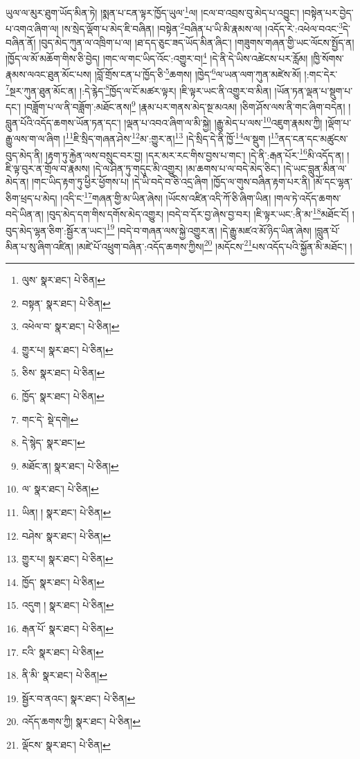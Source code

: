 ཡུལ་ལ་མུར་ཐུག་ཡོད་མིན་ཏེ། །སྨན་པ་ངན་ལྟར་ཁྱོད་ཡུལ་\footnote{ལུས་  སྣར་ཐང་།  པེ་ཅིན། }ལ། །ངལ་བ་འབྲས་བུ་མེད་པ་འབྱུང་། །བསྟེན་པར་བྱེད་པ་འགའ་ཞིག་ལ། །ས་སྲེད་ལྡོག་པ་མེད་ཇི་བཞིན། །བསྟེན་\footnote{བསྟན་  སྣར་ཐང་།  པེ་ཅིན། }བཞིན་པ་ཡི་མི་རྣམས་ལ། །འདོད་རེ་:འཕེལ་བའང་\footnote{འཕེལ་བ་  སྣར་ཐང་།  པེ་ཅིན། }དེ་བཞིན་ནོ། །བུད་མེད་ཀུན་ལ་འཁྲིག་པ་ལ། །ཐ་དད་ཅུང་ཟད་ཡོད་མིན་ཞིང་། །གཟུགས་གཞན་གྱི་ཡང་ལོངས་སྤྱོད་ན། །ཁྱོད་ལ་མོ་མཆོག་གིས་ཅི་བྱེད། །གང་ལ་གང་ཡིད་འོང་:འགྱུར་བ།\footnote{གྱུར་པ།  སྣར་ཐང་།  པེ་ཅིན། } །དེ་ནི་དེ་ཡིས་འཚེངས་པར་རློམ། །ཁྱི་སོགས་རྣམས་ལའང་ཐུན་མོང་པས། །བློ་གྲོས་ངན་པ་ཁྱོད་ཅི་\footnote{ཅིས་  སྣར་ཐང་།  པེ་ཅིན། }ཆགས། །ཁྱེད་\footnote{ཁྱོད་  སྣར་ཐང་།  པེ་ཅིན། }ལ་ཡན་ལག་ཀུན་མཛེས་མོ། །:གང་དེར་\footnote{གང་དེ་  སྡེ་དགེ། }སྔར་ཀུན་ཐུན་མོང་ན། །:དེ་རྙེད་\footnote{དེ་སྙེད་  སྣར་ཐང་། }ཁྱོད་ལ་ངོ་མཚར་ལྟར། །ཇི་ལྟར་ཡང་ནི་འགྱུར་བ་མིན། །ཡོན་ཏན་ལྡན་པ་སྡུག་པ་དང་། །བཟློག་པ་ལ་ནི་བཟློག་:མཐོང་ནས།\footnote{མཐོང་ན།  སྣར་ཐང་།  པེ་ཅིན། } །རྣམ་པར་གནས་མེད་སྔ་མའམ། །ཅིག་ཤོས་ལས་ནི་གང་ཞིག་བདེན། །བླུན་པོའི་འདོད་ཆགས་ཡོན་ཏན་དང་། །ལྡན་པ་འབའ་ཞིག་ལ་མི་སྐྱེ། །རྒྱུ་མེད་པ་ལས་\footnote{ལ་  སྣར་ཐང་།  པེ་ཅིན། }འཇུག་རྣམས་ཀྱི། །ལྡོག་པ་རྒྱུ་ལས་ག་ལ་ཞིག །\footnote{ཡིན། །  སྣར་ཐང་།  པེ་ཅིན། }ཇི་སྲིད་གཞན་ཤེས་\footnote{བཤེས་  སྣར་ཐང་།  པེ་ཅིན། }མ་:གྱུར་ན།\footnote{གྱུར་པ།  སྣར་ཐང་།  པེ་ཅིན། } །དེ་སྲིད་དེ་ནི་ཁྱོ་\footnote{ཁྱོད་  སྣར་ཐང་།  པེ་ཅིན། }ལ་སྡུག །\footnote{འདུག །  སྣར་ཐང་།  པེ་ཅིན། }ནད་ངན་དང་མཚུངས་བུད་མེད་ནི། །རྟག་ཏུ་རྐྱེན་ལས་བསྲུང་བར་བྱ། །དར་མར་རང་གིས་བྱས་པ་གང་། །དེ་ནི་:རྒན་པོར་\footnote{རྒན་པོ་  སྣར་ཐང་།  པེ་ཅིན། }མི་འདོད་ན། །ཇི་ལྟ་བུར་ན་གྲོལ་བ་རྣམས། །དེ་ལ་ཤིན་ཏུ་གདུང་མི་འགྱུར། །མ་ཆགས་པ་ལ་བདེ་མེད་ཅིང་། །དེ་ཡང་བླུན་མིན་ལ་མེད་ན། །གང་ཡིད་རྟག་ཏུ་ཕྱིར་ཕྱོགས་པ། །དེ་ཡི་བདེ་བ་ཅི་འདྲ་ཞིག །ཁྱོད་ལ་གུས་བཞིན་རྟག་པར་ནི། །མོ་དང་ལྷན་ཅིག་ཕྲད་པ་མེད། །འདི་ང་\footnote{ངའི་  སྣར་ཐང་།  པེ་ཅིན། }གཞན་གྱི་མ་ཡིན་ཞེས། །ཡོངས་འཛིན་འདི་ཀོ་ཅི་ཞིག་ཡིན། །གལ་ཏེ་འདོད་ཆགས་བདེ་ཡིན་ན། །བུད་མེད་དག་གིས་དགོས་མེད་འགྱུར། །བདེ་བ་དོར་བྱ་ཞེས་བྱ་བར། །ཇི་ལྟར་ཡང་:ནི་མ་\footnote{ནི་མི་  སྣར་ཐང་།  པེ་ཅིན། }མཐོང་ངོ། །བུད་མེད་ལྷན་ཅིག་:སྦྱོར་ན་ཡང་།\footnote{སྦྱོར་བ་ནའང་།  སྣར་ཐང་།  པེ་ཅིན། } །བདེ་བ་གཞན་ལས་སྐྱེ་འགྱུར་ན། །དེ་རྒྱུ་མཛའ་མོ་ཉིད་ཡིན་ཞེས། །བླུན་པོ་མིན་པ་སུ་ཞིག་འཛིན། །མཛེ་པོ་འཕྲུག་བཞིན་:འདོད་ཆགས་ཀྱིས།\footnote{འདོད་ཆགས་ཀྱི།  སྣར་ཐང་།  པེ་ཅིན། } །མདོངས་\footnote{ལྡོངས་  སྣར་ཐང་།  པེ་ཅིན། }པས་འདོད་པའི་སྐྱོན་མི་མཐོང་། །
